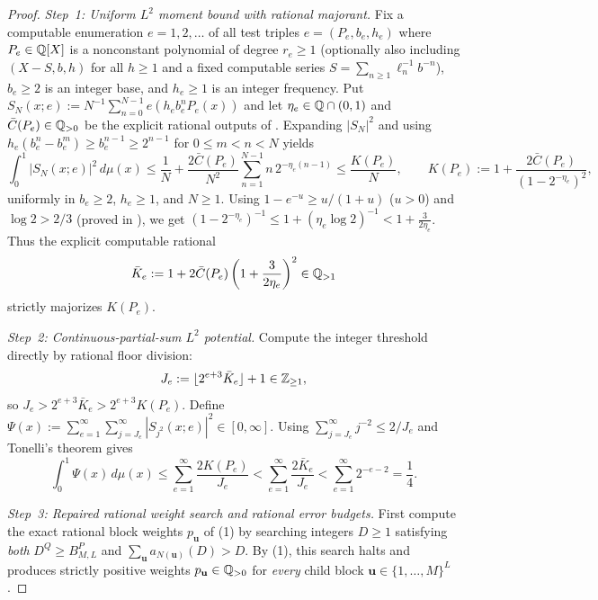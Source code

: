 \documentclass[11pt]{article}
\begin{document}
\begin{proof}
\emph{Step~1: Uniform $L^2$ moment bound with rational majorant.}
Fix a computable enumeration $e=1,2,\dots$ of all test triples $e=(P_e,b_e,h_e)$ where $P_e\in\mathbb Q[X]$ is a nonconstant polynomial of degree $r_e\ge1$ (optionally also including $(X-S,b,h)$ for all $h\ge1$ and a fixed computable series $S=\sum_{n\ge1}\ell_n^{-1}b^{-n}$), $b_e\ge2$ is an integer base, and $h_e\ge1$ is an integer frequency. Put $S_N(x;e):=N^{-1}\sum_{n=0}^{N-1}e(h_eb_e^nP_e(x))$ and let $\eta_e\in\mathbb Q\cap(0,1)$ and $\bar C(P_e)\in\mathbb Q_{>0}$ be the explicit rational outputs of . Expanding $|S_N|^2$ and using $h_e(b_e^n-b_e^m)\ge b_e^{n-1}\ge 2^{n-1}$ for $0\le m<n<N$ yields
\[
\int_0^1|S_N(x;e)|^2\,d\mu(x)\le\frac1N+\frac{2\bar C(P_e)}{N^2}\sum_{n=1}^{N-1}n\,2^{-\eta_e(n-1)}\le\frac{K(P_e)}{N},\qquad K(P_e):=1+\frac{2\bar C(P_e)}{(1-2^{-\eta_e})^2},
\]
uniformly in $b_e\ge2$, $h_e\ge1$, and $N\ge1$. Using $1-e^{-u}\ge u/(1+u)$ ($u>0$) and $\log 2>2/3$ (proved in ), we get $(1-2^{-\eta_e})^{-1}\le 1+(\eta_e\log 2)^{-1}<1+\frac3{2\eta_e}$. Thus the explicit computable rational
\[
\bar K_e:=1+2\bar C(P_e)\left(1+\frac3{2\eta_e}\right)^2\in\mathbb Q_{>1}
\]
strictly majorizes $K(P_e)$.

\emph{Step~2: Continuous-partial-sum $L^2$ potential.}
Compute the integer threshold directly by rational floor division:
\[
J_e:=\lfloor 2^{e+3}\bar K_e\rfloor+1\in\mathbb Z_{\ge1},
\]
so $J_e>2^{e+3}\bar K_e>2^{e+3}K(P_e)$. Define $\Psi(x):=\sum_{e=1}^\infty\sum_{j=J_e}^\infty|S_{j^2}(x;e)|^2\in[0,\infty]$. Using $\sum_{j=J_e}^\infty j^{-2}\le 2/J_e$ and Tonelli's theorem gives
\[
\int_0^1\Psi(x)\,d\mu(x)\le\sum_{e=1}^\infty\frac{2K(P_e)}{J_e}<\sum_{e=1}^\infty\frac{2\bar K_e}{J_e}<\sum_{e=1}^\infty 2^{-e-2}=\frac14.
\]

\emph{Step~3: Repaired rational weight search and rational error budgets.}
First compute the exact rational block weights $p_{\mathbf{u}}$ of (1) by searching integers $D\ge1$ satisfying \emph{both} $D^Q\ge B_{M,L}^P$ and $\sum_{\mathbf{u}}a_{N(\mathbf{u})}(D)>D$. By (1), this search halts and produces strictly positive weights $p_{\mathbf{u}}\in\mathbb Q_{>0}$ for \emph{every} child block $\mathbf{u}\in\{1,\dots,M\}^L$.


\end{proof}
\end{document}
